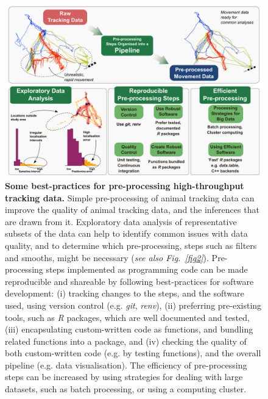\begin{refsection}
    \begin{figure}
        \begin{addmargin}{-.3\textwidth}%
        \centering
        \captionsetup{width=13.5cm}
        \includegraphics[width=13.5cm]{figures/preprocessing/fig_01.png}
        \end{addmargin}
        \caption{
            {\small
            \textbf{Some best-practices for pre-processing high-throughput tracking data.}
            Simple pre-processing of animal tracking data can improve the quality of animal tracking data, and the inferences that are drawn from it.
            Exploratory data analysis of representative subsets of the data can help to identify common issues with data quality, and to determine which pre-processing, steps such as filters and smooths, might be necessary (\textit{see also Fig.~\ref{fig2}}).
            Pre-processing steps implemented as programming code can be made reproducible and shareable by following best-practices for software development: (i) tracking changes to the steps, and the software used, using version control (e.g. \textit{git}, \textit{renv}), (ii) preferring pre-existing tools, such as \textit{R} packages, which are well documented and tested, (iii) encapsulating custom-written code as functions, and bundling related functions into a package, and (iv) checking the quality of both custom-written code (e.g. by testing functions), and the overall pipeline (e.g. data visualisation).
            The efficiency of pre-processing steps can be increased by using strategies for dealing with large datasets, such as batch processing, or using a computing cluster.
}}
\end{figure}
\end{refsection}
